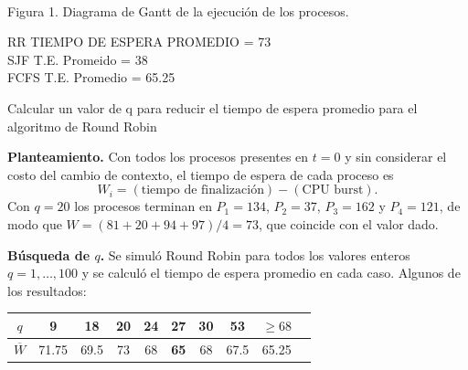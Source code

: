 \documentclass[a4paper, 11pt]{article}
\newcommand{\Aspace}{0.2cm}
\begin{document}
\begin{enumerate}
\begin{center}
\\[2pt] {\footnotesize\color{black} Figura 1. Diagrama de Gantt de la ejecución de los procesos.}
\end{center}
    RR TIEMPO DE ESPERA PROMEDIO = 73 \\
    SJF T.E. Promeido = 38 \\
    FCFS T.E. Promedio = 65.25
        \vspace{\Aspace} \par
        Calcular un valor de q  para reducir el tiempo de espera promedio para el algoritmo de Round Robin
        \par { \color{azul} 
        \textbf{Planteamiento.} Con todos los procesos presentes en $t=0$ y sin considerar el costo del cambio de contexto, el tiempo de espera de cada proceso es
        \[ W_i = (\text{tiempo de finalización}) - (\text{CPU burst}). \]
        Con $q=20$ los procesos terminan en $P_1=134$, $P_2=37$, $P_3=162$ y $P_4=121$, de modo que $W = (81+20+94+97)/4 = 73$, que coincide con el valor dado.

        \textbf{Búsqueda de $q$.} Se simuló Round Robin para todos los valores enteros $q=1,\dots,100$ y se calculó el tiempo de espera promedio en cada caso. Algunos de los resultados:

        \begin{center}
        \begin{tabular}{|c|c|c|c|c|c|c|c|c|c|}
            \hline
            $q$ & 9 & 18 & 20 & 24 & \textbf{27} & 30 & 53 & $\ge 68$ \\
            \hline
            $\overline{W}$ & 71.75 & 69.5 & 73 & 68 & \textbf{65} & 68 & 67.5 & 65.25 \\
            \hline
        \end{tabular}
        \end{center}

}
\end{enumerate}
\end{document}
